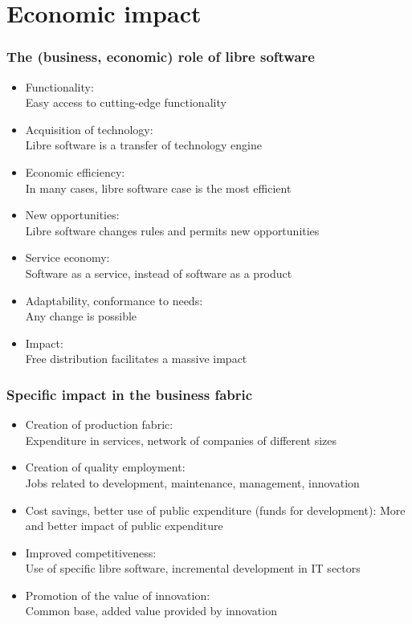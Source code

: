 

\section{Economic impact}


\begin{frame}
\frametitle{The (business, economic) role of libre software}

\begin{itemize}
\item Functionality: \\
  Easy access to cutting-edge functionality
\item Acquisition of technology: \\
  Libre software is a transfer of technology engine
\item Economic efficiency: \\
  In many cases, libre software case is the most efficient
\item New opportunities: \\
  Libre software changes rules and permits new opportunities
\item Service economy: \\
  Software as a service, instead of software as a product
\item Adaptability, conformance to needs: \\
  Any change is possible
\item Impact: \\
  Free distribution facilitates a massive impact
\end{itemize}
\end{frame}


\begin{frame}
\frametitle{Specific impact in the business fabric}

\begin{itemize}
\item Creation of production fabric: \\
  Expenditure in services, network of companies of different sizes
\item Creation of quality employment: \\
  Jobs related to development, maintenance, management, innovation
\item Cost savings, better use of public expenditure (funds for development):
  More and better impact of public expenditure
\item Improved competitiveness: \\
  Use of specific libre software, incremental development in IT sectors
\item Promotion of the value of innovation: \\
  Common base, added value provided by innovation
\end{itemize}

\end{frame}


